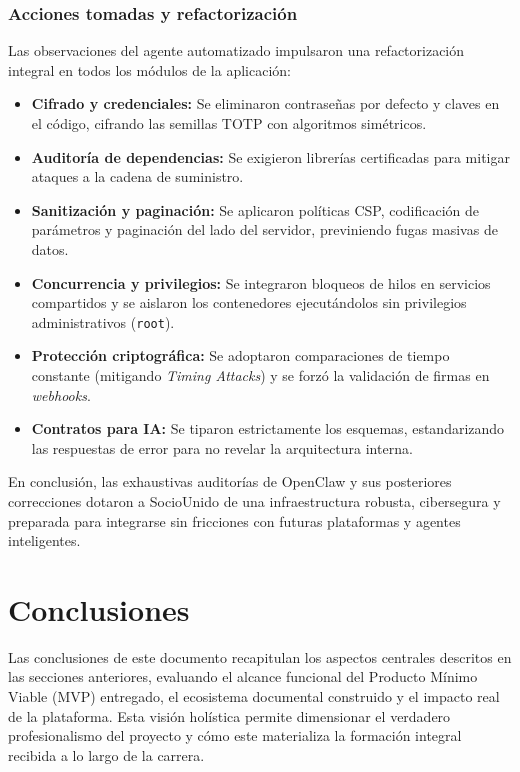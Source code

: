 \documentclass[conference, a4paper]{IEEEtran}
\begin{document}
\subsubsection{Acciones tomadas y refactorizaci\'on}
Las observaciones del agente automatizado impulsaron una refactorizaci\'on integral en todos los m\'odulos de la aplicaci\'on:

\begin{itemize}
    \item \textbf{Cifrado y credenciales:} Se eliminaron contrase\~nas por defecto y claves en el c\'odigo, cifrando las semillas TOTP con algoritmos sim\'etricos.
    \item \textbf{Auditor\'ia de dependencias:} Se exigieron librer\'ias certificadas para mitigar ataques a la cadena de suministro.
    \item \textbf{Sanitizaci\'on y paginaci\'on:} Se aplicaron pol\'iticas CSP, codificaci\'on de par\'ametros y paginaci\'on del lado del servidor, previniendo fugas masivas de datos.
    \item \textbf{Concurrencia y privilegios:} Se integraron bloqueos de hilos en servicios compartidos y se aislaron los contenedores ejecut\'andolos sin privilegios administrativos (\texttt{root}).
    \item \textbf{Protecci\'on criptogr\'afica:} Se adoptaron comparaciones de tiempo constante (mitigando \textit{Timing Attacks}) y se forz\'o la validaci\'on de firmas en \textit{webhooks}.
    \item \textbf{Contratos para IA:} Se tiparon estrictamente los esquemas, estandarizando las respuestas de error para no revelar la arquitectura interna.
\end{itemize}

En conclusi\'on, las exhaustivas auditor\'ias de OpenClaw y sus posteriores correcciones dotaron a SocioUnido de una infraestructura robusta, cibersegura y preparada para integrarse sin fricciones con futuras plataformas y agentes inteligentes.

\section{Conclusiones}

Las conclusiones de este documento recapitulan los aspectos centrales descritos en las secciones anteriores, evaluando el alcance funcional del Producto M\'inimo Viable (MVP) entregado, el ecosistema documental construido y el impacto real de la plataforma. Esta visi\'on hol\'istica permite dimensionar el verdadero profesionalismo del proyecto y c\'omo este materializa la formaci\'on integral recibida a lo largo de la carrera.
\end{document}
